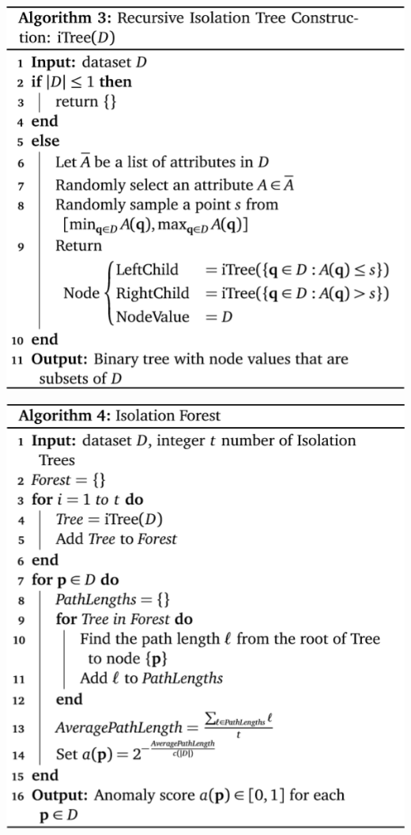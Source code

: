 \documentclass[20pt,landscape,footrule,headrule]{foils}
\begin{document}
{{\begin{center}\includegraphics[height=\textheight]{Images/Algorithm3}
\end{center}
\begin{center}\includegraphics[height=\textheight]{Images/Algorithm4}
\end{center}

}}
\end{document}
